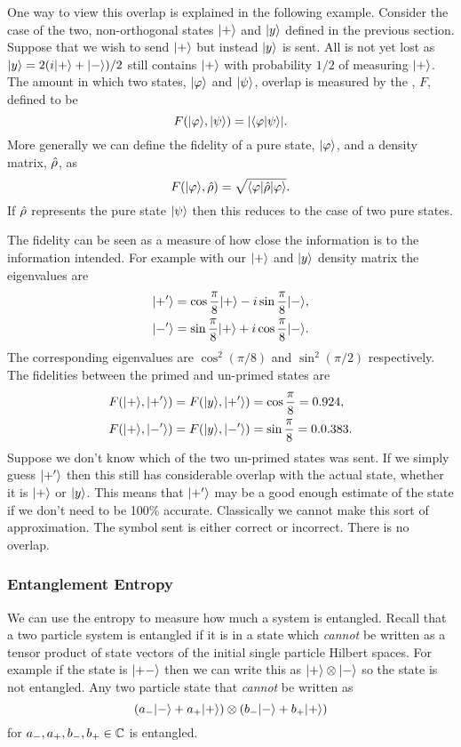     One way to view this overlap is explained in the following example.
    Consider the case of the two, non-orthogonal states \(\vert {+} \rangle\) and \(\vert {y} \rangle\) defined in the previous section.
    Suppose that we wish to send \(\vert {+} \rangle\) but instead \(\vert {y} \rangle\) is sent.
    All is not yet lost as \(\vert {y} \rangle = 2(i\vert {+} \rangle + \vert {-} \rangle)/2\) still contains \(\vert {+} \rangle\) with probability \(1/2\) of measuring \(\vert {+} \rangle\).
    The amount in which two states, \(\vert {\varphi} \rangle\) and \(\vert {\psi} \rangle\), overlap is measured by the , \(F\), defined to be
    \[F(\vert {\varphi} \rangle, \vert {\psi} \rangle) = \abs{\langle {\varphi} \vert {\psi} \rangle}.\]
    More generally we can define the fidelity of a pure state, \(\vert {\varphi} \rangle\), and a density matrix, \(\hat{\rho}\), as
    \[F(\vert {\varphi} \rangle, \hat{\rho}) = \sqrt{\langle {\varphi} \vert\hat{\rho}\vert {\varphi} \rangle}.\]
    If \(\hat{\rho}\) represents the pure state \(\vert {\psi} \rangle\) then this reduces to the case of two pure states.
    
    The fidelity can be seen as a measure of how close the information is to the information intended.
    For example with our \(\vert {+} \rangle\) and \(\vert {y} \rangle\) density matrix the eigenvalues are
    \begin{align*}
        \vert {+'} \rangle &= \cos\frac{\pi}{8}\vert {+} \rangle - i\sin\frac{\pi}{8}\vert {-} \rangle,\\
        \vert {-'} \rangle &= \sin\frac{\pi}{8}\vert {+} \rangle + i\cos\frac{\pi}{8}\vert {-} \rangle.
    \end{align*}
    The corresponding eigenvalues are \(\cos^2(\pi/8)\) and \(\sin^2(\pi/2)\) respectively.
    The fidelities between the primed and un-primed states are
    \begin{align*}
        F(\vert {+} \rangle, \vert {+'} \rangle) &= F(\vert {y} \rangle, \vert {+'} \rangle) = \cos\frac{\pi}{8} = 0.924,\\
        F(\vert {+} \rangle, \vert {-'} \rangle) &= F(\vert {y} \rangle, \vert {-'} \rangle) = \sin\frac{\pi}{8} = 0.0.383.
    \end{align*}
    Suppose we don't know which of the two un-primed states was sent.
    If we simply guess \(\vert {+'} \rangle\) then this still has considerable overlap with the actual state, whether it is \(\vert {+} \rangle\) or \(\vert {y} \rangle\).
    This means that \(\vert {+'} \rangle\) may be a good enough estimate of the state if we don't need to be 100\% accurate.
    Classically we cannot make this sort of approximation.
    The symbol sent is either correct or incorrect.
    There is no overlap.
    
    \subsubsection{Entanglement Entropy}
    We can use the entropy to measure how much a system is entangled.
    Recall that a two particle system is entangled if it is in a state which \emph{cannot} be written as a tensor product of state vectors of the initial single particle Hilbert spaces.
    For example if the state is \(\vert {+-} \rangle\) then we can write this as \(\vert {+} \rangle\otimes\vert {-} \rangle\) so the state is not entangled.
    Any two particle state that \emph{cannot} be written as
    \[(a_-\vert {-} \rangle + a_+\vert {+} \rangle)\otimes(b_-\vert {-} \rangle + b_+\vert {+} \rangle)\]
    for \(a_-, a_+, b_-, b_+\in\mathbb{C}\) is entangled.
    
